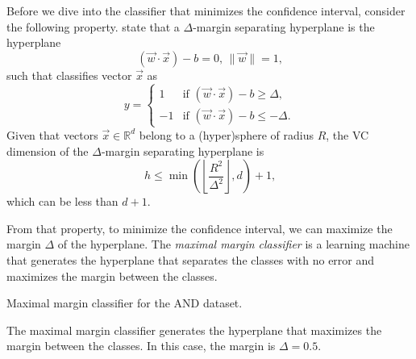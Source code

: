 Before we dive into the classifier that minimizes the confidence interval, consider the
following property.  \textcite{Vapnik1999b} state that a
$\Delta$-margin separating hyperplane is the hyperplane
\[
  (\vec{w} \cdot \vec{x}) - b = 0\text{, } \|\vec{w}\| = 1\text{,}
\]
such that classifies vector $\vec{x}$ as
\[
  y = \begin{cases}
    1 & \text{if } (\vec{w} \cdot \vec{x}) - b \geq \Delta\text{,} \\
    -1 & \text{if } (\vec{w} \cdot \vec{x}) - b \leq -\Delta\text{.}
  \end{cases}
\]
Given that vectors $\vec{x} \in \mathbb{R}^d$ belong to a (hyper)sphere of radius $R$, the
VC dimension of the $\Delta$-margin separating hyperplane is
\[
  h \leq \min\left(\left\lfloor \frac{R^2}{\Delta^2} \right\rfloor, d\right) + 1\text{,}
\]
which can be less than $d + 1$.

From that property, to minimize the confidence interval, we can maximize the margin
$\Delta$ of the hyperplane.  The \emph{maximal margin classifier} is a learning machine
that generates the hyperplane that separates the classes with no error and maximizes the
margin between the classes.

\begin{figurebox}[label=fig:maximal-margin-and]{Maximal margin classifier for the AND dataset.}
  \centering
  \tcblower
  The maximal margin classifier generates the hyperplane that maximizes the margin between
  the classes.  In this case, the margin is $\Delta = 0.5$.
\end{figurebox}

